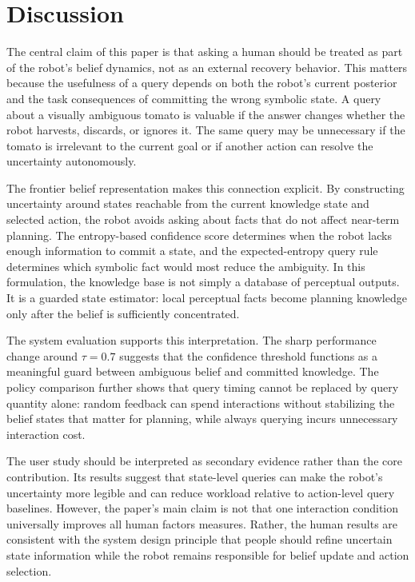 \section{Discussion}
\label{sec:discussion}

The central claim of this paper is that asking a human should be treated as part of the robot's belief dynamics, not as an external recovery behavior. This matters because the usefulness of a query depends on both the robot's current posterior and the task consequences of committing the wrong symbolic state. A query about a visually ambiguous tomato is valuable if the answer changes whether the robot harvests, discards, or ignores it. The same query may be unnecessary if the tomato is irrelevant to the current goal or if another action can resolve the uncertainty autonomously.

The frontier belief representation makes this connection explicit. By constructing uncertainty around states reachable from the current knowledge state and selected action, the robot avoids asking about facts that do not affect near-term planning. The entropy-based confidence score determines when the robot lacks enough information to commit a state, and the expected-entropy query rule determines which symbolic fact would most reduce the ambiguity. In this formulation, the knowledge base is not simply a database of perceptual outputs. It is a guarded state estimator: local perceptual facts become planning knowledge only after the belief is sufficiently concentrated.

The system evaluation supports this interpretation. The sharp performance change around $\tau=0.7$ suggests that the confidence threshold functions as a meaningful guard between ambiguous belief and committed knowledge. The policy comparison further shows that query timing cannot be replaced by query quantity alone: random feedback can spend interactions without stabilizing the belief states that matter for planning, while always querying incurs unnecessary interaction cost.

The user study should be interpreted as secondary evidence rather than the core contribution. Its results suggest that state-level queries can make the robot's uncertainty more legible and can reduce workload relative to action-level query baselines. However, the paper's main claim is not that one interaction condition universally improves all human factors measures. Rather, the human results are consistent with the system design principle that people should refine uncertain state information while the robot remains responsible for belief update and action selection.

